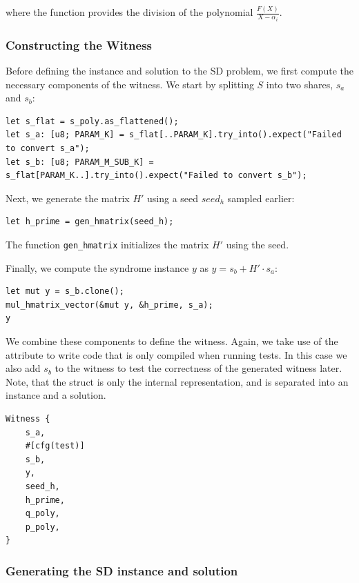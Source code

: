 \documentclass[11pt]{report}
\theoremstyle{definition}
\theoremstyle{plain}
\begin{document}
where the function  provides the division of the polynomial $\frac{F(X)}{X - \alpha_i}$.

\subsubsection{Constructing the Witness}

Before defining the instance and solution to the SD problem, we first compute the necessary components of the witness. We start by splitting $S$ into two shares, $s_a$ and $s_b$:

\begin{verbatim}
let s_flat = s_poly.as_flattened();
let s_a: [u8; PARAM_K] = s_flat[..PARAM_K].try_into().expect("Failed to convert s_a");
let s_b: [u8; PARAM_M_SUB_K] = s_flat[PARAM_K..].try_into().expect("Failed to convert s_b");
\end{verbatim}

Next, we generate the matrix $H'$ using a seed $seed_h$ sampled earlier:

\begin{verbatim}
let h_prime = gen_hmatrix(seed_h);
\end{verbatim}

The function \texttt{gen\_hmatrix} initializes the matrix $H'$ using the seed.

Finally, we compute the syndrome instance $y$ as $y = s_b + H' \cdot s_a$:

\begin{verbatim}
let mut y = s_b.clone();
mul_hmatrix_vector(&mut y, &h_prime, s_a);
y
\end{verbatim}

We combine these components to define the witness. Again, we take use of the  attribute to write code that is only compiled when running tests. In this case we also add $s_b$ to the witness to test the correctness of the generated witness later. Note, that the  struct is only the internal representation, and is separated into an instance and a solution.

\begin{verbatim}
Witness {
    s_a,
    #[cfg(test)]
    s_b,
    y,
    seed_h,
    h_prime,
    q_poly,
    p_poly,
}
\end{verbatim}

\subsubsection{Generating the SD instance and solution}
\end{document}
